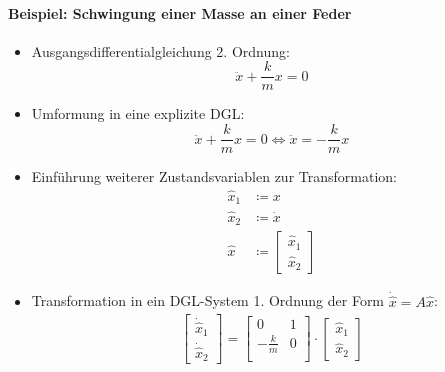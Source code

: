 \documentclass[a4paper, 11pt, accentcolor = tud3b]{tudreport}
\begin{document}
                \paragraph{Beispiel: Schwingung einer Masse an einer Feder}
	                \begin{itemize}
	                	\item Ausgangsdifferentialgleichung 2. Ordnung:
		                	\begin{equation*}
			                	\ddot{x} + \frac{k}{m} x = 0
		                	\end{equation*}
		                \item Umformung in eine explizite DGL:
			                \begin{equation*}
				                \ddot{x} + \frac{k}{m} x = 0 \iff \ddot{x} = - \frac{k}{m} x
			                \end{equation*}
		                \item Einführung weiterer Zustandsvariablen zur Transformation:
			                \begin{align*}
				                \hat{x} _ 1 &\coloneqq x \\
				                \hat{x} _ 2 &\coloneqq \dot{x} \\
				                \hat{x}     &\coloneqq
					                \begin{bmatrix}
						                \hat{x} _ 1 \\
						                \hat{x} _ 2
					                \end{bmatrix}
			                \end{align*}
			            \item Transformation in ein DGL-System 1. Ordnung der Form \( \dot{\hat{x}} = A\hat{x} \):
				            \begin{align*}
					            \begin{bmatrix}
						            \dot{\hat{x}} _ 1 \\
						            \dot{\hat{x}} _ 2
					            \end{bmatrix}
					            =
					            \begin{bmatrix}
						            0            & 1 \\
						            -\frac{k}{m} & 0 \\
					            \end{bmatrix}
					            \cdot
					            \begin{bmatrix}
						            \hat{x} _ 1 \\
						            \hat{x} _ 2
					            \end{bmatrix}
				            \end{align*}
	                \end{itemize}
\end{document}
